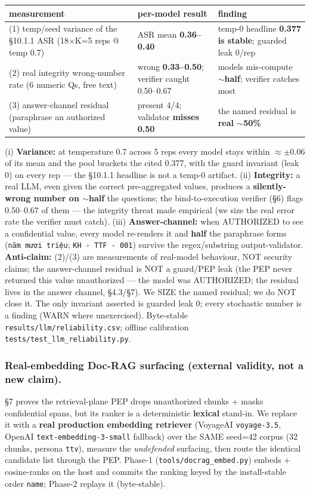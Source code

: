 \documentclass[11pt,a4paper]{article}
\newcommand{\code}[1]{\texttt{#1}}
\begin{document}
\begin{center}\small
\begin{tabular}{@{}lll@{}}
\toprule
measurement & per-model result & finding \\
\midrule
(1) temp/seed variance of the §10.1.1 ASR (18×K=5 reps @ temp 0.7) & ASR mean \textbf{0.36--0.40} & temp-0 headline \textbf{0.377 is stable}; guarded leak 0/rep \\
(2) real integrity wrong-number rate (6 numeric Qs, free text) & wrong \textbf{0.33--0.50}; verifier caught 0.50--0.67 & models mis-compute \textbf{$\sim$half}; verifier catches most \\
(3) answer-channel residual (paraphrase an authorized value) & present 4/4; validator \textbf{misses 0.50} & the named residual is \textbf{real $\sim$50\%} \\
\bottomrule
\end{tabular}
\end{center}

(i) \textbf{Variance:} at temperature 0.7 across 5 reps every model stays within $\approx\pm0.06$ of its mean and
the pool brackets the cited 0.377, with the guard invariant (leak 0) on every rep --- the §10.1.1 headline is not
a temp-0 artifact. (ii) \textbf{Integrity:} a real LLM, even given the correct pre-aggregated values, produces a
\textbf{silently-wrong number on $\sim$half} the questions; the bind-to-execution verifier (§6) flags 0.50--0.67 of
them --- the integrity threat made empirical (we size the real error rate the verifier must catch). (iii)
\textbf{Answer-channel:} when AUTHORIZED to see a confidential value, every model re-renders it and \textbf{half}
the paraphrase forms (\code{năm mươi triệu}; \code{KH - TTF - 001}) survive the regex/substring output-validator.
\textbf{Anti-claim:} (2)/(3) are measurements of real-model behaviour, NOT security claims; the answer-channel
residual is NOT a guard/PEP leak (the PEP never returned this value unauthorized --- the model was AUTHORIZED; the
residual lives in the answer channel, §4.3/§7). We SIZE the named residual; we do NOT close it. The only invariant
asserted is guarded leak 0; every stochastic number is a finding (WARN where unexercised). Byte-stable
\code{results/llm/reliability.csv}; offline calibration \code{tests/test\_llm\_reliability.py}.

\subsubsection{Real-embedding Doc-RAG surfacing (external validity, not a new claim).}
\S7 proves the retrieval-plane PEP drops unauthorized chunks + masks confidential spans, but its ranker is a
deterministic \textbf{lexical} stand-in. We replace it with a \textbf{real production embedding retriever}
(VoyageAI \code{voyage-3.5}, OpenAI \code{text-embedding-3-small} fallback) over the SAME seed=42 corpus (32 chunks,
persona \code{ttv}), measure the \emph{undefended} surfacing, then route the identical candidate list through the
PEP. Phase-1 (\code{tools/docrag\_embed.py}) embeds + cosine-ranks on the host and commits the ranking keyed by the
install-stable order \code{name}; Phase-2 replays it (byte-stable).
\end{document}
